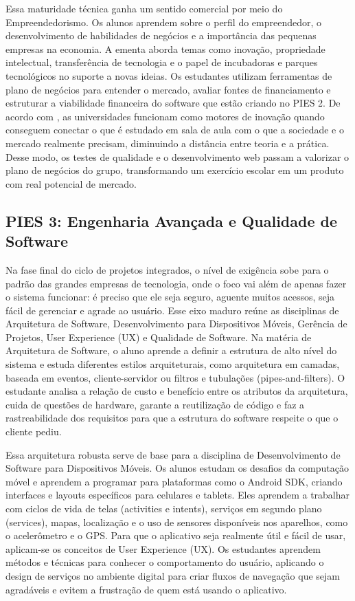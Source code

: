 Essa maturidade técnica ganha um sentido comercial por meio do
Empreendedorismo. Os alunos aprendem sobre o perfil do empreendedor, o
desenvolvimento de habilidades de negócios e a importância das pequenas
empresas na economia. A ementa aborda temas como inovação, propriedade
intelectual, transferência de tecnologia e o papel de incubadoras e parques
tecnológicos no suporte a novas ideias. Os estudantes utilizam ferramentas de
plano de negócios para entender o mercado, avaliar fontes de financiamento e
estruturar a viabilidade financeira do software que estão criando no PIES 2. De
acordo com , as universidades funcionam como
motores de inovação quando conseguem conectar o que é estudado em sala de aula
com o que a sociedade e o mercado realmente precisam, diminuindo a distância
entre teoria e a prática. Desse modo, os testes de qualidade e o
desenvolvimento web passam a valorizar o plano de negócios do grupo,
transformando um exercício escolar em um produto com real potencial de mercado.

\subsection{ PIES 3: Engenharia Avançada e Qualidade de Software} \label{sec:pies-3}

Na fase final do ciclo de projetos integrados, o nível de exigência sobe para o
padrão das grandes empresas de tecnologia, onde o foco vai além de apenas fazer
o sistema funcionar: é preciso que ele seja seguro, aguente muitos acessos,
seja fácil de gerenciar e agrade ao usuário. Esse eixo maduro reúne as
disciplinas de Arquitetura de Software, Desenvolvimento para Dispositivos
Móveis, Gerência de Projetos, User Experience (UX) e Qualidade de Software. Na
matéria de Arquitetura de Software, o aluno aprende a definir a estrutura de
alto nível do sistema e estuda diferentes estilos arquiteturais, como
arquitetura em camadas, baseada em eventos, cliente-servidor ou filtros e
tubulações (pipes-and-filters). O estudante analisa a relação de custo e
benefício entre os atributos da arquitetura, cuida de questões de hardware,
garante a reutilização de código e faz a rastreabilidade dos requisitos para
que a estrutura do software respeite o que o cliente pediu.

Essa arquitetura robusta serve de base para a disciplina de Desenvolvimento de
Software para Dispositivos Móveis. Os alunos estudam os desafios da computação
móvel e aprendem a programar para plataformas como o Android SDK, criando
interfaces e layouts específicos para celulares e tablets. Eles aprendem a
trabalhar com ciclos de vida de telas (activities e intents), serviços em
segundo plano (services), mapas, localização e o uso de sensores disponíveis
nos aparelhos, como o acelerômetro e o GPS. Para que o aplicativo seja
realmente útil e fácil de usar, aplicam-se os conceitos de User Experience
(UX). Os estudantes aprendem métodos e técnicas para conhecer o comportamento
do usuário, aplicando o design de serviços no ambiente digital para criar
fluxos de navegação que sejam agradáveis e evitem a frustração de quem está
usando o aplicativo.

